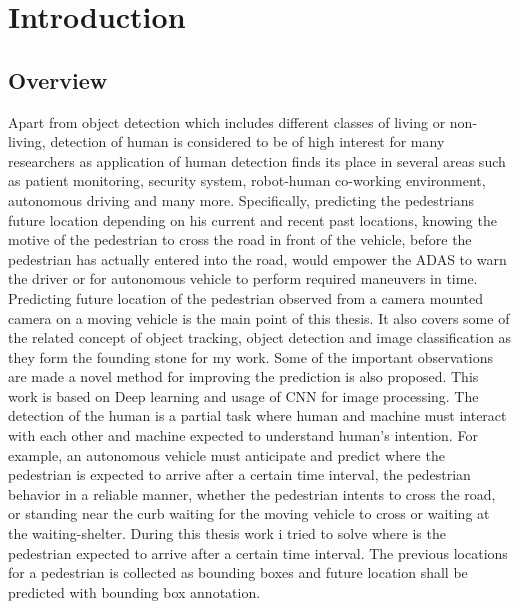 \pagestyle{fancy}
\fancyhf{}
\fancyhead[EL]{\leftmark} %
\fancyhead[OL]{\leftmark}
\fancyhead[ER,OR]{\thepage}

\setcounter{page}{1}

\chapter{Introduction}
\section{Overview}
Apart from object detection which includes different classes of living or non-living, detection of human is considered to be of high interest for many researchers as application of human detection finds its place in several areas such as patient monitoring, security system, robot-human co-working environment, autonomous driving and many more. Specifically, predicting the pedestrians future 
location depending on his current and recent past locations, knowing the motive of the pedestrian to cross the road in front of the vehicle, before the pedestrian has actually entered into the road, would empower the ADAS to warn the driver or for autonomous vehicle to perform required maneuvers in time.
Predicting future location of the pedestrian observed from a camera mounted camera on a moving vehicle is the main point of this thesis. It also covers some of the related concept of object tracking, object detection and image classification as they form the founding stone for my work. Some of the important observations are made a novel method for improving the prediction is also proposed. This work is based on Deep learning and usage of CNN for image processing. The detection of the human is a partial task where human and machine must interact with each other and machine expected to understand human's intention. For example, an autonomous vehicle must anticipate and predict where the pedestrian is expected to arrive after a certain time interval, the pedestrian behavior in a reliable manner, whether the pedestrian intents to cross the road, or standing near the curb waiting for the moving vehicle to cross or waiting at the waiting-shelter. During this thesis work i tried to solve where is the pedestrian expected to arrive after a certain time interval. The previous locations for a pedestrian is collected as bounding boxes and future location shall be predicted with bounding box annotation.

